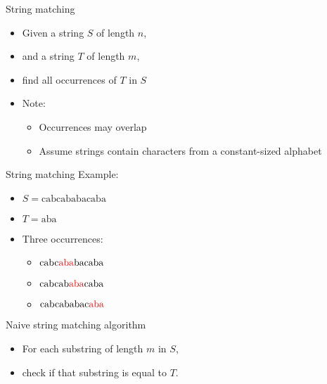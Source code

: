 \documentclass[12pt,t]{beamer}
\begin{document}
\begin{frame}{String matching}
    \vspace{30pt}

	\begin{itemize}
		\item Given a string $S$ of length $n$,
		\item and a string $T$ of length $m$,
		\item find all occurrences of $T$ in $S$
    \end{itemize}
    \begin{itemize}
		\item Note:
        \begin{itemize}
            \item Occurrences may overlap
            \item Assume strings contain characters from a constant-sized alphabet
        \end{itemize}
	\end{itemize}
\end{frame}

\begin{frame}{String matching}
    \vspace{30pt}
	Example:
	\begin{itemize}
		\item $S = \mathrm{cabcababacaba}$
		\item $T = \mathrm{aba}$
	\end{itemize}
    \begin{itemize}
        \item<2-> Three occurrences:
            \begin{itemize}
                \item<3-> $\mathrm{cabc{\color{red}{aba}}bacaba}$
                \item<4-> $\mathrm{cabcab{\color{red}{aba}}caba}$
                \item<5-> $\mathrm{cabcababac{\color{red}{aba}}}$
            \end{itemize}
    \end{itemize}
\end{frame}



\begin{frame}{Naive string matching algorithm}
    \vspace{30pt}
	\begin{itemize}
	\item For each substring of length $m$ in $S$,
	\item check if that substring is equal to $T$.
	\end{itemize}
		
\end{frame}
\end{document}
